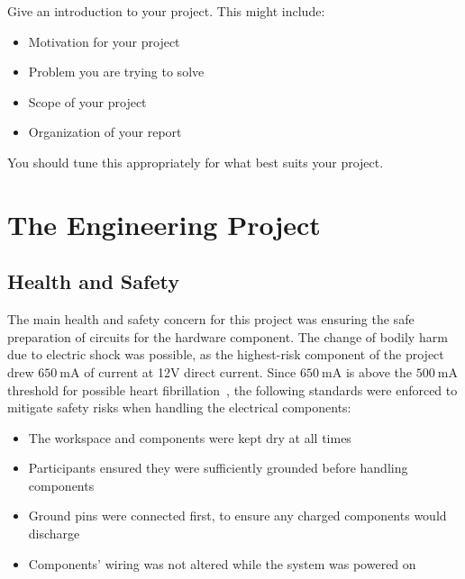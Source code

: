 \documentclass[12pt]{report}
\let\Oldsection\section
\renewcommand{\section}{\FloatBarrier\Oldsection}
\begin{document}
Give an introduction to your project.  This might include:
\begin{itemize}
  \item Motivation for your project
  \item Problem you are trying to solve
  \item Scope of your project
  \item Organization of your report
\end{itemize}
You should tune this appropriately for what best suits your project.



\chapter{The Engineering Project} \label{the-engineering-project}


\section{Health and Safety} \label{health-and-safety}

The main health and safety concern for this project was ensuring the safe preparation of circuits for the hardware 
component. The change of bodily harm due to electric shock was possible, as the highest-risk component of the project 
drew $\SI{650}{\milli\ampere}$ of current at 12V direct current. Since $\SI{650}{\milli\ampere}$ is above the 
$\SI{500}{\milli\ampere}$ threshold for possible heart fibrillation~\autocite{CURRENTDANGER}, the following standards
were enforced to mitigate safety risks when handling the electrical components:
\begin{itemize}
    \item The workspace and components were kept dry at all times
    \item Participants ensured they were sufficiently grounded before handling components
    \item Ground pins were connected first, to ensure any charged components would discharge
    \item Components' wiring was not altered while the system was powered on
\end{itemize}
\end{document}
